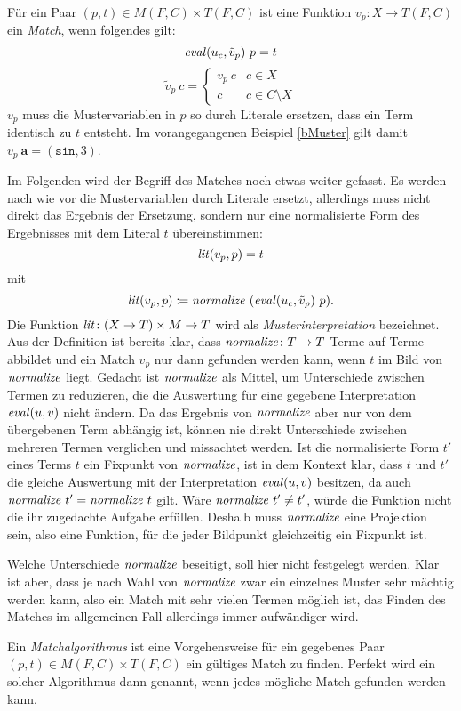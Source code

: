 \begin{definition}~\\ \label{defMatch}
Für ein Paar $(p, t) \in M(F, C) \times T(F, C)$ ist eine Funktion $v_p \colon X \rightarrow T(F, C)$ ein \emph{Match}, wenn folgendes gilt:
$$\mathit{eval}(u_c, \tilde v_p)~ p = t$$
$$\tilde v_p~ c = \begin{cases}
	v_p~ c & c \in X\\
	c      & c \in C \setminus X
\end{cases}$$
$v_p$ muss die Mustervariablen in $p$ so durch Literale ersetzen, dass ein Term identisch zu $t$ entsteht. 
Im vorangegangenen Beispiel \ref{bMuster} gilt damit $v_p~ \mathbf a = (\texttt{sin}, 3)$.

Im Folgenden wird der Begriff des Matches noch etwas weiter gefasst. Es werden nach wie vor die Mustervariablen durch Literale ersetzt, allerdings muss nicht direkt das Ergebnis der Ersetzung, sondern nur eine normalisierte Form des Ergebnisses mit dem Literal $t$ übereinstimmen:
$$\mathit{lit}(v_p, p)  = t$$
mit 
$$\mathit{lit}(v_p, p) \coloneqq \mathit{normalize}~(\mathit{eval}(u_c, \tilde v_p)~ p).$$
Die Funktion $\Const{lit} \colon \paren*{X \rightarrow T} \times M \rightarrow T$ wird als \emph{Musterinterpretation} bezeichnet.
Aus der Definition ist bereits klar, dass $\mathit{normalize} \colon T \rightarrow T$ Terme auf Terme abbildet und ein Match $v_p$ nur dann gefunden werden kann, wenn $t$ im Bild von $\mathit{normalize}$ liegt. 
Gedacht ist $\mathit{normalize}$ als Mittel, um Unterschiede zwischen Termen zu reduzieren, die die Auswertung für eine gegebene Interpretation $\mathit{eval}(u, v)$ nicht ändern. Da das Ergebnis von $\mathit{normalize}$ aber nur von dem übergebenen Term abhängig ist, können nie direkt Unterschiede zwischen mehreren Termen verglichen und missachtet werden. Ist die normalisierte Form $t'$ eines Terms $t$ ein Fixpunkt von $\mathit{normalize}$, ist in dem Kontext klar, dass $t$ und $t'$ die gleiche Auswertung mit der Interpretation $\mathit{eval}(u, v)$ besitzen, da auch $\mathit{normalize}~t' = \mathit{normalize}~t$ gilt. Wäre $\mathit{normalize}~t' \neq t'$, würde die Funktion nicht die ihr zugedachte Aufgabe erfüllen. Deshalb muss $\mathit{normalize}$ eine Projektion sein, also eine Funktion, für die jeder Bildpunkt gleichzeitig ein Fixpunkt ist. 

Welche Unterschiede $\mathit{normalize}$ beseitigt, soll hier nicht festgelegt werden. Klar ist aber, dass je nach Wahl von $\mathit{normalize}$ zwar ein einzelnes Muster sehr mächtig werden kann, also ein Match mit sehr vielen Termen möglich ist, das Finden des Matches im allgemeinen Fall allerdings immer aufwändiger wird. 

\end{definition}

Ein \emph{Matchalgorithmus} ist eine Vorgehensweise für ein gegebenes Paar {$(p, t) \in M(F, C) \times T(F, C)$} ein gültiges Match zu finden. Perfekt wird ein solcher Algorithmus dann genannt, wenn jedes mögliche Match gefunden werden kann.


